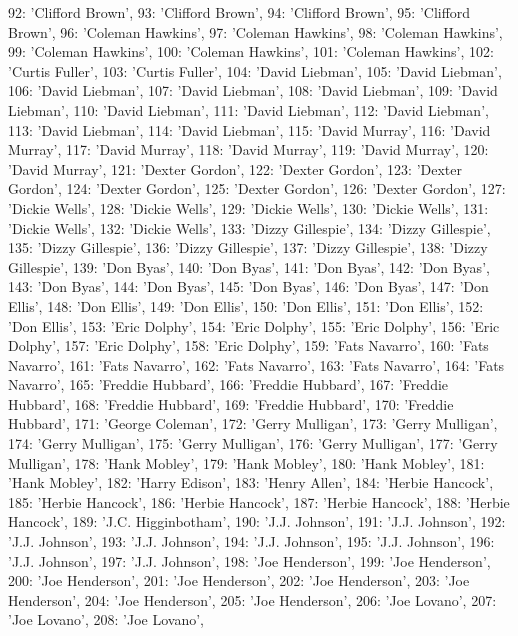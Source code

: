 \documentclass[letterpaper,10pt,english]{sphinxmanual}
\begin{document}
{\begin{sphinxVerbatim}[commandchars=\\\{\}]
 92: 'Clifford Brown',
 93: 'Clifford Brown',
 94: 'Clifford Brown',
 95: 'Clifford Brown',
 96: 'Coleman Hawkins',
 97: 'Coleman Hawkins',
 98: 'Coleman Hawkins',
 99: 'Coleman Hawkins',
 100: 'Coleman Hawkins',
 101: 'Coleman Hawkins',
 102: 'Curtis Fuller',
 103: 'Curtis Fuller',
 104: 'David Liebman',
 105: 'David Liebman',
 106: 'David Liebman',
 107: 'David Liebman',
 108: 'David Liebman',
 109: 'David Liebman',
 110: 'David Liebman',
 111: 'David Liebman',
 112: 'David Liebman',
 113: 'David Liebman',
 114: 'David Liebman',
 115: 'David Murray',
 116: 'David Murray',
 117: 'David Murray',
 118: 'David Murray',
 119: 'David Murray',
 120: 'David Murray',
 121: 'Dexter Gordon',
 122: 'Dexter Gordon',
 123: 'Dexter Gordon',
 124: 'Dexter Gordon',
 125: 'Dexter Gordon',
 126: 'Dexter Gordon',
 127: 'Dickie Wells',
 128: 'Dickie Wells',
 129: 'Dickie Wells',
 130: 'Dickie Wells',
 131: 'Dickie Wells',
 132: 'Dickie Wells',
 133: 'Dizzy Gillespie',
 134: 'Dizzy Gillespie',
 135: 'Dizzy Gillespie',
 136: 'Dizzy Gillespie',
 137: 'Dizzy Gillespie',
 138: 'Dizzy Gillespie',
 139: 'Don Byas',
 140: 'Don Byas',
 141: 'Don Byas',
 142: 'Don Byas',
 143: 'Don Byas',
 144: 'Don Byas',
 145: 'Don Byas',
 146: 'Don Byas',
 147: 'Don Ellis',
 148: 'Don Ellis',
 149: 'Don Ellis',
 150: 'Don Ellis',
 151: 'Don Ellis',
 152: 'Don Ellis',
 153: 'Eric Dolphy',
 154: 'Eric Dolphy',
 155: 'Eric Dolphy',
 156: 'Eric Dolphy',
 157: 'Eric Dolphy',
 158: 'Eric Dolphy',
 159: 'Fats Navarro',
 160: 'Fats Navarro',
 161: 'Fats Navarro',
 162: 'Fats Navarro',
 163: 'Fats Navarro',
 164: 'Fats Navarro',
 165: 'Freddie Hubbard',
 166: 'Freddie Hubbard',
 167: 'Freddie Hubbard',
 168: 'Freddie Hubbard',
 169: 'Freddie Hubbard',
 170: 'Freddie Hubbard',
 171: 'George Coleman',
 172: 'Gerry Mulligan',
 173: 'Gerry Mulligan',
 174: 'Gerry Mulligan',
 175: 'Gerry Mulligan',
 176: 'Gerry Mulligan',
 177: 'Gerry Mulligan',
 178: 'Hank Mobley',
 179: 'Hank Mobley',
 180: 'Hank Mobley',
 181: 'Hank Mobley',
 182: 'Harry Edison',
 183: 'Henry Allen',
 184: 'Herbie Hancock',
 185: 'Herbie Hancock',
 186: 'Herbie Hancock',
 187: 'Herbie Hancock',
 188: 'Herbie Hancock',
 189: 'J.C. Higginbotham',
 190: 'J.J. Johnson',
 191: 'J.J. Johnson',
 192: 'J.J. Johnson',
 193: 'J.J. Johnson',
 194: 'J.J. Johnson',
 195: 'J.J. Johnson',
 196: 'J.J. Johnson',
 197: 'J.J. Johnson',
 198: 'Joe Henderson',
 199: 'Joe Henderson',
 200: 'Joe Henderson',
 201: 'Joe Henderson',
 202: 'Joe Henderson',
 203: 'Joe Henderson',
 204: 'Joe Henderson',
 205: 'Joe Henderson',
 206: 'Joe Lovano',
 207: 'Joe Lovano',
 208: 'Joe Lovano',

\end{sphinxVerbatim}}
\end{document}
